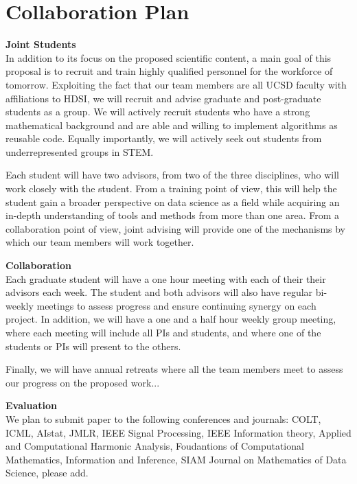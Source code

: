 \documentclass{article}
\begin{document}
\section{Collaboration Plan}

{\bf Joint Students}\\
In addition to its focus on the proposed scientific content, a main goal of this proposal is to recruit and train highly qualified personnel for the workforce of tomorrow. Exploiting the fact that our team members are all UCSD faculty with affiliations to HDSI, we will recruit and advise graduate and post-graduate students as a
group. We will actively recruit students who have a strong
mathematical background and are able and willing to implement
algorithms as reusable code. Equally importantly, we will actively seek out students from underrepresented groups in STEM. 

Each student will have two advisors, from two of the three disciplines, who will work closely with the student. From a training point of view, this will help the student gain a broader perspective on data science as a field while acquiring an in-depth understanding of tools and methods from more than one area. From a collaboration point of view, joint advising will provide one of the mechanisms by which our team members will work together. 

{\bf Collaboration}\\ 
Each graduate student will have a one hour meeting with each of their
their advisors each week. The student and both advisors will also have regular bi-weekly meetings to assess progress and ensure continuing synergy on each project.  In addition, we will have a one and a half hour weekly group meeting, where each meeting will include all PIs and students, and where one of the students or PIs will present to the others. 

Finally, we will have annual retreats where all the team members meet to assess our progress on the proposed work...

{\bf Evaluation}\\
We plan to submit paper to the following conferences and journals:
COLT, ICML, AIstat, JMLR, IEEE Signal Processing, IEEE Information
theory, Applied and Computational Harmonic Analysis, Foudantions of Computational Mathematics, Information and Inference, SIAM Journal on Mathematics of Data Science, please add.
\end{document}
